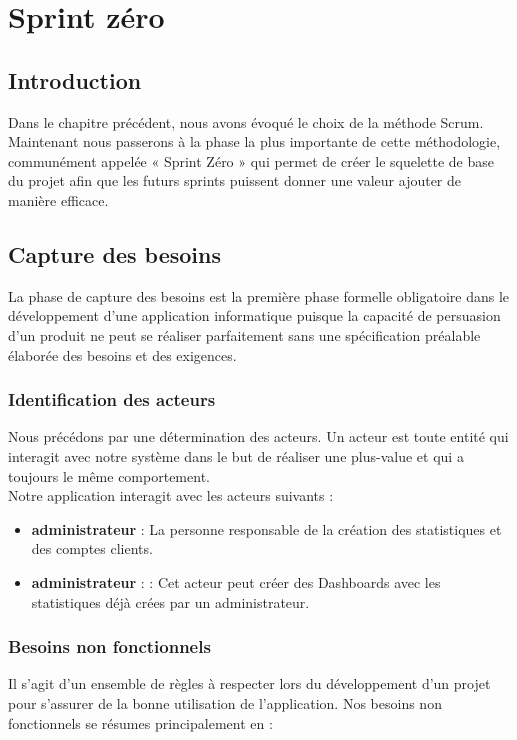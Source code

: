 \chapter{Sprint zéro}
\section*{Introduction}
Dans le chapitre précédent, nous avons évoqué le choix de la méthode Scrum. Maintenant nous passerons à la phase la plus importante de cette méthodologie, communément appelée « Sprint Zéro » qui permet de créer le squelette de base du projet afin que les futurs sprints puissent donner une valeur ajouter de manière efficace.
\section{Capture des besoins}
La phase de capture des besoins est la première phase formelle obligatoire dans le développement d’une application informatique puisque la capacité de persuasion d’un produit ne peut se réaliser parfaitement sans une spécification préalable élaborée des besoins et des exigences.
\subsection{Identification des acteurs}
Nous précédons par une détermination des acteurs. Un acteur est toute entité qui interagit avec notre système dans le but de réaliser une plus-value et qui a toujours le même comportement.\\
Notre application interagit avec les acteurs suivants :
\begin{itemize}
    \item \textbf{administrateur} : La personne responsable de la création des statistiques et des comptes clients.
    \item \textbf{administrateur} : : Cet acteur peut créer des Dashboards avec les statistiques déjà crées par un administrateur. 
\end{itemize}

\subsection{Besoins non fonctionnels}
Il s’agit d’un ensemble de règles à respecter lors du développement d'un projet pour s'assurer de la bonne utilisation de l'application. Nos besoins non fonctionnels se résumes principalement en :

